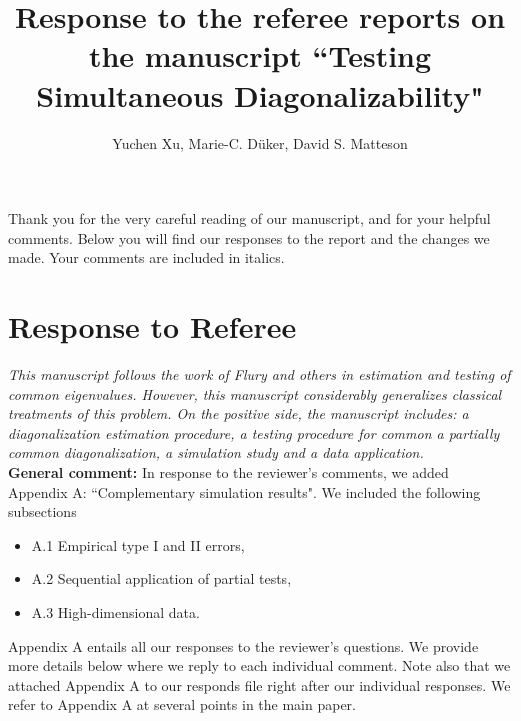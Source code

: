 \documentclass[12pt]{article}
\title{Response to the referee reports on the manuscript ``Testing Simultaneous Diagonalizability"}
\author{Yuchen Xu, Marie-C. D\"uker, David S. Matteson}
\numberwithin{equation}{section}
\numberwithin{table}{section}
\numberwithin{thm}{section}
\numberwithin{defn}{section}
\numberwithin{lem}{section}
\numberwithin{prop}{section}
\numberwithin{cor}{section}
\numberwithin{rem}{section}
\begin{document}
\maketitle

Thank you for the very careful reading of our manuscript, and for your helpful comments. 
Below you will find our responses to the report and the changes we made. Your comments are included in italics.




\section*{Response to Referee}

\textit{This manuscript follows the work of Flury and others in estimation and testing of common eigenvalues. However, this manuscript considerably generalizes classical treatments of this problem.  On the positive side, the manuscript includes: a diagonalization estimation procedure, a testing procedure for common a partially common diagonalization, a simulation study and a data application.}
\vspace{0.2cm}\\
\textbf{General comment:}
In response to the reviewer's comments, we added Appendix A: ``Complementary simulation results". We included the following subsections 
\begin{itemize}
    \item A.1 Empirical type I and II errors,
    \item A.2 Sequential application of partial tests,
    \item A.3 High-dimensional data.
\end{itemize}
Appendix A entails all our responses to the reviewer's questions. We provide more details below where we reply to each individual comment. Note also that we attached Appendix A to our responds file right after our individual responses. We refer to Appendix A at several points in the main paper.
\end{document}
